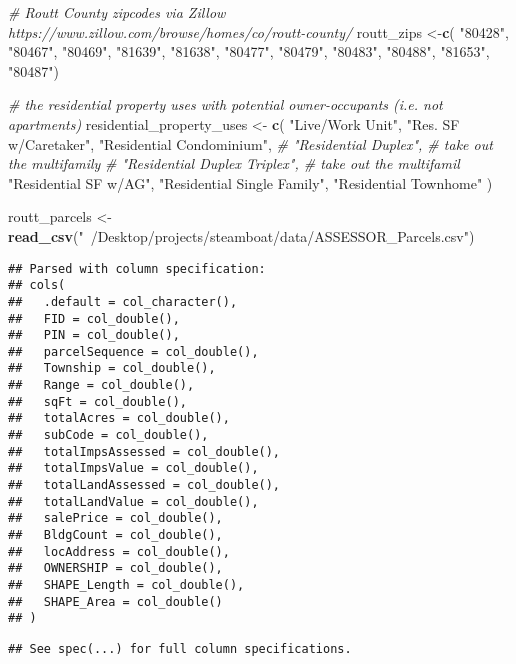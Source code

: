 \documentclass[]{article}
\newenvironment{Shaded}{\begin{snugshade}}{\end{snugshade}}
\newcommand{\CommentTok}[1]{\textcolor[rgb]{0.56,0.35,0.01}{\textit{#1}}}
\newcommand{\KeywordTok}[1]{\textcolor[rgb]{0.13,0.29,0.53}{\textbf{#1}}}
\newcommand{\NormalTok}[1]{#1}
\newcommand{\StringTok}[1]{\textcolor[rgb]{0.31,0.60,0.02}{#1}}
\begin{document}
\begin{Shaded}
\begin{Highlighting}[]
\CommentTok{# Routt County zipcodes via Zillow https://www.zillow.com/browse/homes/co/routt-county/}
\NormalTok{routt_zips <-}\KeywordTok{c}\NormalTok{(    }\StringTok{"80428"}\NormalTok{,}
    \StringTok{"80467"}\NormalTok{,}
    \StringTok{"80469"}\NormalTok{,}
    \StringTok{"81639"}\NormalTok{,}
    \StringTok{"81638"}\NormalTok{,}
    \StringTok{"80477"}\NormalTok{,}
    \StringTok{"80479"}\NormalTok{,}
    \StringTok{"80483"}\NormalTok{,}
    \StringTok{"80488"}\NormalTok{,}
    \StringTok{"81653"}\NormalTok{,}
    \StringTok{"80487"}\NormalTok{)}

\CommentTok{# the residential property uses with potential owner-occupants (i.e. not apartments)}
\NormalTok{residential_property_uses <-}\StringTok{ }\KeywordTok{c}\NormalTok{(}
  \StringTok{"Live/Work Unit"}\NormalTok{,}
  \StringTok{"Res. SF w/Caretaker"}\NormalTok{,}
  \StringTok{"Residential Condominium"}\NormalTok{,}
  \CommentTok{# "Residential Duplex", # take out the multifamily}
  \CommentTok{# "Residential Duplex Triplex", # take out the multifamil}
  \StringTok{"Residential SF w/AG"}\NormalTok{,}
  \StringTok{"Residential Single Family"}\NormalTok{,}
  \StringTok{"Residential Townhome"}
\NormalTok{)}

\NormalTok{routt_parcels <-}\StringTok{ }\KeywordTok{read_csv}\NormalTok{(}\StringTok{"~/Desktop/projects/steamboat/data/ASSESSOR_Parcels.csv"}\NormalTok{)}
\end{Highlighting}
\end{Shaded}

\begin{verbatim}
## Parsed with column specification:
## cols(
##   .default = col_character(),
##   FID = col_double(),
##   PIN = col_double(),
##   parcelSequence = col_double(),
##   Township = col_double(),
##   Range = col_double(),
##   sqFt = col_double(),
##   totalAcres = col_double(),
##   subCode = col_double(),
##   totalImpsAssessed = col_double(),
##   totalImpsValue = col_double(),
##   totalLandAssessed = col_double(),
##   totalLandValue = col_double(),
##   salePrice = col_double(),
##   BldgCount = col_double(),
##   locAddress = col_double(),
##   OWNERSHIP = col_double(),
##   SHAPE_Length = col_double(),
##   SHAPE_Area = col_double()
## )
\end{verbatim}

\begin{verbatim}
## See spec(...) for full column specifications.
\end{verbatim}
\end{document}
